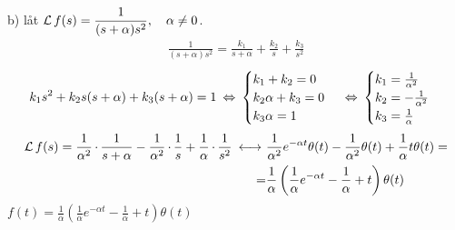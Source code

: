 \begin{task}{b)}
	låt $\operatorname{\mathcal{L}} f(s)=\dfrac{1}{(s+\alpha)s^2}, \quad \alpha \neq 0$.
	\begin{align*}
	\frac{1}{(s+\alpha)s^2}=
	\frac{k_1}{s+\alpha}+\frac{k_2}{s}+\frac{k_3}{s^2}
	\end{align*}
	\[k_1s^2+k_2s(s+\alpha)+k_3(s+\alpha)=1\lra
	\begin{cases}
	k_1+k_2=0 \\
	k_2\alpha +k_3=0 \\
	k_3\alpha=1
	\end{cases}\lra
	\begin{cases}
	k_1=\frac{1}{\alpha^2} \\
	k_2=-\frac{1}{\alpha^2} \\
	k_3=\frac{1}{\alpha}
	\end{cases}\]
	\begin{align*}
	\laplace f(s)=
	\frac{1}{\alpha^2}\*\frac{1}{s+\alpha}-\frac{1}{\alpha^2}\*\frac{1}{s}+\frac{1}{\alpha}\*\frac{1}{s^2} \llra
	&\frac{1}{\alpha^2}e^{-\alpha t}\theta(t)-\frac{1}{\alpha^2}\theta(t)+\frac{1}{\alpha}t\theta(t)= \\ =
	&\frac{1}{\alpha}\left(\frac{1}{\alpha}e^{-\alpha t}-\frac{1}{\alpha}+t\right)\theta(t)
	\end{align*}
	\ans $f(t)=\frac{1}{\alpha}\left(\frac{1}{\alpha}e^{-\alpha t}-\frac{1}{\alpha}+t\right)\theta(t)$
\end{task}